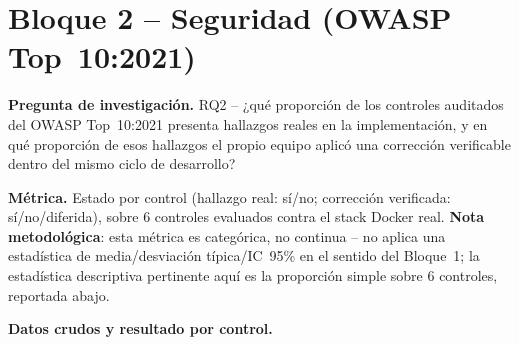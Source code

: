 \section{Bloque 2 -- Seguridad (OWASP Top~10:2021)}
\label{sec:res-seguridad}

\textbf{Pregunta de investigación.} RQ2 -- ¿qué proporción de los
controles auditados del OWASP Top~10:2021 presenta hallazgos reales en la
implementación, y en qué proporción de esos hallazgos el propio equipo
aplicó una corrección verificable dentro del mismo ciclo de desarrollo?

\textbf{Métrica.} Estado por control (hallazgo real: sí/no; corrección
verificada: sí/no/diferida), sobre 6 controles evaluados contra el stack
Docker real. \textbf{Nota metodológica}: esta métrica es categórica, no
continua -- no aplica una estadística de media/desviación típica/IC~95\%
en el sentido del Bloque~1; la estadística descriptiva pertinente aquí es
la proporción simple sobre 6 controles, reportada abajo.

\textbf{Datos crudos y resultado por control.}

